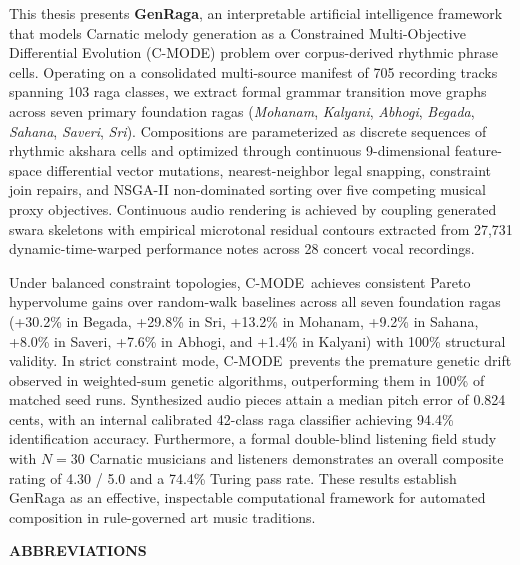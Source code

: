 \documentclass[12pt,a4paper]{report}
\newcommand{\cmode}{C-MODE}
\begin{document}
This thesis presents \textbf{GenRaga}, an interpretable artificial intelligence framework that models Carnatic melody generation as a Constrained Multi-Objective Differential Evolution (\cmode) problem over corpus-derived rhythmic phrase cells. Operating on a consolidated multi-source manifest of 705 recording tracks spanning 103 raga classes, we extract formal grammar transition move graphs across seven primary foundation ragas (\textit{Mohanam}, \textit{Kalyani}, \textit{Abhogi}, \textit{Begada}, \textit{Sahana}, \textit{Saveri}, \textit{Sri}). Compositions are parameterized as discrete sequences of rhythmic akshara cells and optimized through continuous 9-dimensional feature-space differential vector mutations, nearest-neighbor legal snapping, constraint join repairs, and NSGA-II non-dominated sorting over five competing musical proxy objectives. Continuous audio rendering is achieved by coupling generated swara skeletons with empirical microtonal residual contours extracted from 27,731 dynamic-time-warped performance notes across 28 concert vocal recordings.

Under balanced constraint topologies, \cmode\ achieves consistent Pareto hypervolume gains over random-walk baselines across all seven foundation ragas (+30.2\% in Begada, +29.8\% in Sri, +13.2\% in Mohanam, +9.2\% in Sahana, +8.0\% in Saveri, +7.6\% in Abhogi, and +1.4\% in Kalyani) with 100\% structural validity. In strict constraint mode, \cmode\ prevents the premature genetic drift observed in weighted-sum genetic algorithms, outperforming them in 100\% of matched seed runs. Synthesized audio pieces attain a median pitch error of 0.824 cents, with an internal calibrated 42-class raga classifier achieving 94.4\% identification accuracy. Furthermore, a formal double-blind listening field study with $N=30$ Carnatic musicians and listeners demonstrates an overall composite rating of 4.30 / 5.0 and a 74.4\% Turing pass rate. These results establish GenRaga as an effective, inspectable computational framework for automated composition in rule-governed art music traditions.

\newpage
\tableofcontents

\newpage
\listoftables

\newpage
\listoffigures

\newpage
\begin{center}
{\Large \bfseries ABBREVIATIONS \par}
\end{center}
\vspace{0.8cm}
\end{document}
